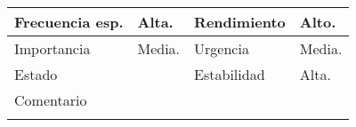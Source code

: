 \documentclass{article}
\begin{document}
\begin{table}[h]
\begin{tabular}{|l|l|l|l|l|l|}
\hline
\multicolumn{1}{|p{2cm}|}{Frecuencia esp.} & \multicolumn{2}{p{3cm}}{Alta.} & \multicolumn{1}{|p{2cm}|}{Rendimiento} & \multicolumn{2}{p{3cm}|}{Alto.}\\
\hline
\multicolumn{1}{|p{2cm}|}{Importancia} & \multicolumn{2}{p{3cm}}{Media.} & \multicolumn{1}{|p{2cm}|}{Urgencia} & \multicolumn{2}{p{3cm}|}{Media.}\\
\hline
\multicolumn{1}{|p{2cm}|}{Estado} & \multicolumn{2}{p{3cm}}{} & \multicolumn{1}{|p{2cm}|}{Estabilidad} & \multicolumn{2}{p{3cm}|}{Alta.}\\
\hline
\multicolumn{6}{|p{10cm}|}{Comentario}\\
\hline
\multicolumn{6}{|p{10cm}|}{}\\
\hline
\end{tabular}
\end{table}
\addtocounter{ni}{1}
\end{document}
